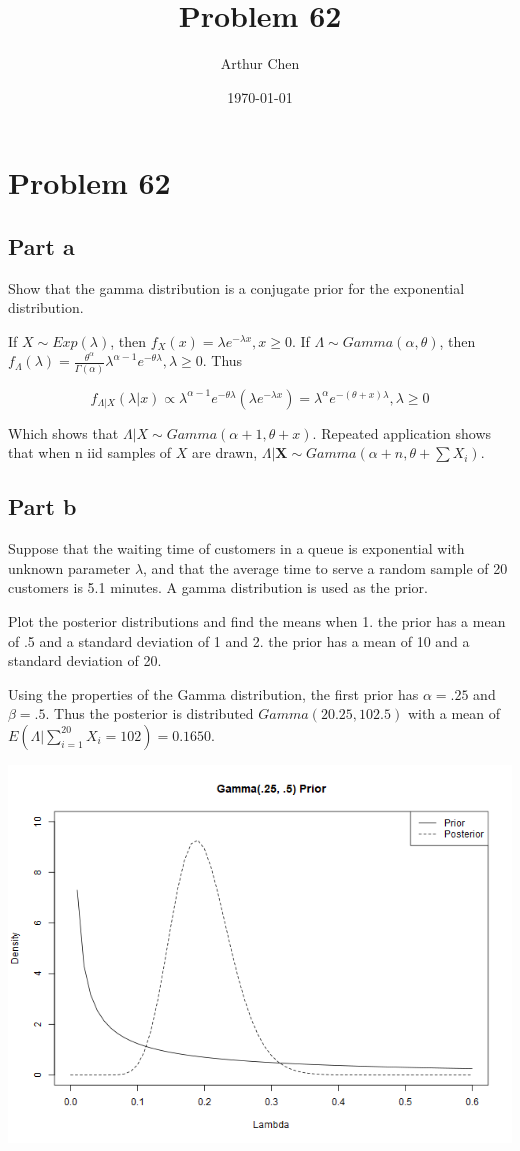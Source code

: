 \documentclass{article}
\author{Arthur Chen}
\title{Problem 62}
\date{\today}
\begin{document}
\section*{Problem 62}

\subsection*{Part a}

Show that the gamma distribution is a conjugate prior for the exponential distribution.

If $X \sim Exp(\lambda)$, then $f_X(x) = \lambda e^{-\lambda x}, x \geq 0$. If $\Lambda \sim Gamma(\alpha, \theta)$, then $f_\Lambda(\lambda) = \frac{\theta^\alpha}{\Gamma(\alpha)} \lambda^{\alpha-1}e^{-\theta \lambda}, \lambda \geq 0$. Thus

\[
f_{\Lambda|X}(\lambda|x) \propto \lambda^{\alpha-1}e^{-\theta\lambda} (\lambda e^{-\lambda x}) = \lambda^\alpha e^{-(\theta + x)\lambda}, \lambda \geq 0
\]

Which shows that $\Lambda|X \sim Gamma(\alpha+1, \theta+x)$. Repeated application shows that when n iid samples of $X$ are drawn, $\Lambda|\mathbf{X} \sim Gamma(\alpha+n, \theta+\sum X_i)$.

\subsection*{Part b}

Suppose that the waiting time of customers in a queue is exponential with unknown parameter $\lambda$, and that the average time to serve a random sample of 20 customers is 5.1 minutes. A gamma distribution is used as the prior.

Plot the posterior distributions and find the means when 1. the prior has a mean of .5 and a standard deviation of 1 and 2. the prior has a mean of 10 and a standard deviation of 20.

Using the properties of the Gamma distribution, the first prior has $\alpha = .25$ and $\beta = .5$. Thus the posterior is distributed $Gamma(20.25, 102.5)$ with a mean of $E(\Lambda|\sum_{i=1}^{20} X_i = 102) = 0.1650$.

\includegraphics[scale = .5]{output/Problem62Plot_a.png}
\end{document}

